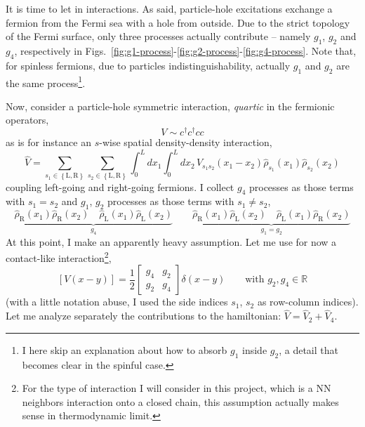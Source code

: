 It is time to let in interactions. As said, particle-hole excitations exchange a fermion from the Fermi sea with a hole from outside. Due to the strict topology of the Fermi surface, only three processes actually contribute -- namely $g_1$, $g_2$ and $g_4$, respectively in Figs.~\ref{fig:g1-process}-\ref{fig:g2-process}-\ref{fig:g4-process}. Note that, for spinless fermions, due to particles indistinguishability, actually $g_1$ and $g_2$ are the same process\footnote{
	I here skip an explanation about how to absorb $g_1$ inside $g_2$, a detail that becomes clear in the spinful case.
}.

Now, consider a particle-hole symmetric interaction, \textit{quartic} in the fermionic operators,
\[
	V \sim c^\dagger c^\dagger c c
\]
as is for instance an $s$-wise spatial density-density interaction,
\[
	\hat V = \sum_{s_1 \in \left\{\mathrm L, \mathrm R\right\}} \sum_{s_2 \in \left\{\mathrm L, \mathrm R\right\}} \int_0^L dx_1 \int_0^L dx_2 \, V_{s_1 s_2}(x_1-x_2) \hat \rho_{s_1}(x_1) \hat \rho_{s_2} (x_2)
\]
coupling left-going and right-going fermions. I collect $g_4$ processes as those terms with $s_1 = s_2$ and $g_1$, $g_2$ processes as those terms with $s_1 \neq s_2$,
\[
	\underbrace{\hat \rho_\mathrm{R} (x_1) \hat \rho_\mathrm{R} (x_2) \quad \hat \rho_\mathrm{L} (x_1) \hat \rho_\mathrm{L} (x_2)}_{g_4} \qquad \underbrace{\hat \rho_\mathrm{R} (x_1) \hat \rho_\mathrm{L} (x_2) \quad \hat \rho_\mathrm{L} (x_1) \hat \rho_\mathrm{R} (x_2)}_{g_1 = g_2}
\]
At this point, I make an apparently heavy assumption. Let me use for now a contact-like interaction\footnote{
	For the type of interaction I will consider in this project, which is a NN neighbors interaction onto a closed chain, this assumption actually makes sense in thermodynamic limit.
},
\[
	\left[V(x-y)\right] = \frac{1}{2} \begin{bmatrix}
		g_4 & g_2 \\ g_2 & g_4
	\end{bmatrix} \delta(x-y)
	\qquad
	\text{with $g_2, g_4 \in \mathbb{R}$}
\]
(with a little notation abuse, I used the side indices $s_1$, $s_2$ as row-column indices). Let me analyze separately the contributions to the hamiltonian: $\hat V = \hat V_2 + \hat V_4$.

